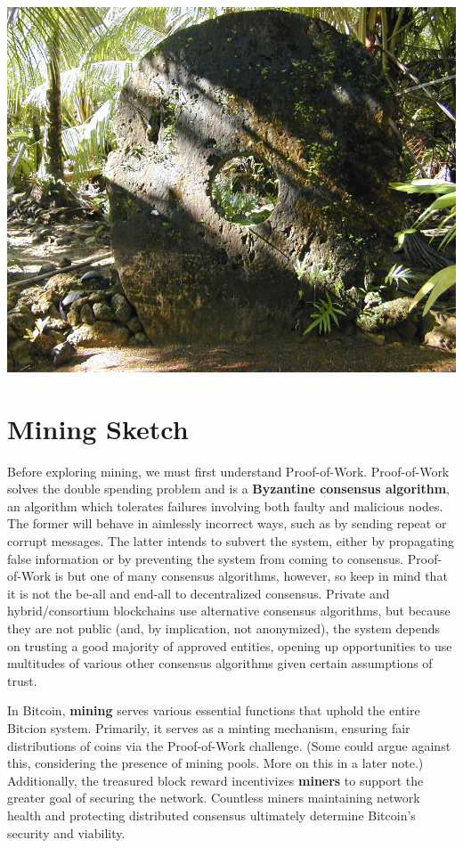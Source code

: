 \documentclass[11pt]{article}
\begin{document}
    \begin{center}
    \includegraphics[scale=0.7]{rai}
    \end{center}
    
    \section*{Mining Sketch}
    
    Before exploring mining, we must first understand Proof-of-Work. Proof-of-Work solves the double spending problem and is a \textbf{Byzantine consensus algorithm}, an algorithm which tolerates failures involving both faulty and malicious nodes. The former will behave in aimlessly incorrect ways, such as by sending repeat or corrupt messages. The latter intends to subvert the system, either by propagating false information or by preventing the system from coming to consensus. Proof-of-Work is but one of many consensus algorithms, however, so keep in mind that it is not the be-all and end-all to decentralized consensus. Private and hybrid/consortium blockchains use alternative consensus algorithms, but because they are not public (and, by implication, not anonymized), the system depends on trusting a good majority of approved entities, opening up opportunities to use multitudes of various other consensus algorithms given certain assumptions of trust.
    
    In Bitcoin, \textbf{mining} serves various essential functions that uphold the entire Bitcion system. Primarily, it serves as a minting mechanism, ensuring fair distributions of coins via the Proof-of-Work challenge. (Some could argue against this, considering the presence of mining pools. More on this in a later note.) Additionally, the treasured block reward incentivizes \textbf{miners} to support the greater goal of securing the network. Countless miners maintaining network health and protecting distributed consensus ultimately determine Bitcoin's security and viability.
    
\end{document}
